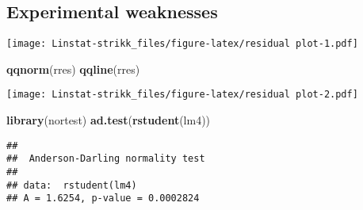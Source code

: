 \documentclass[]{article}
\newenvironment{Shaded}{\begin{snugshade}}{\end{snugshade}}
\newcommand{\KeywordTok}[1]{\textcolor[rgb]{0.13,0.29,0.53}{\textbf{#1}}}
\newcommand{\StringTok}[1]{\textcolor[rgb]{0.31,0.60,0.02}{#1}}
\newcommand{\OperatorTok}[1]{\textcolor[rgb]{0.81,0.36,0.00}{\textbf{#1}}}
\newcommand{\NormalTok}[1]{#1}
\begin{document}
\subsection{Experimental weaknesses}\label{experimental-weaknesses}

\begin{Shaded}
\end{Shaded}

\texttt{[image: Linstat-strikk\_files/figure-latex/residual plot-1.pdf]}

\begin{Shaded}
\begin{Highlighting}[]
\KeywordTok{qqnorm}\NormalTok{(rres)}
\KeywordTok{qqline}\NormalTok{(rres)}
\end{Highlighting}
\end{Shaded}

\texttt{[image: Linstat-strikk\_files/figure-latex/residual plot-2.pdf]}

\begin{Shaded}
\begin{Highlighting}[]
\KeywordTok{library}\NormalTok{(nortest)}
\KeywordTok{ad.test}\NormalTok{(}\KeywordTok{rstudent}\NormalTok{(lm4))}
\end{Highlighting}
\end{Shaded}

\begin{verbatim}
## 
##  Anderson-Darling normality test
## 
## data:  rstudent(lm4)
## A = 1.6254, p-value = 0.0002824
\end{verbatim}
\end{document}
